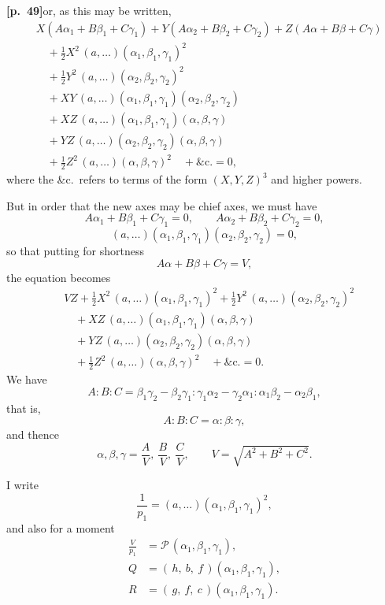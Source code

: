 \documentclass[11pt,a4paper]{article}
\begin{document}
\noindent\textbf{[p.~49]}\quad or, as this may be written,
\begin{align*}
& X(A\alpha_{1} + B\beta_{1} + C\gamma_{1}) + Y(A\alpha_{2} + B\beta_{2} + C\gamma_{2}) + Z(A\alpha + B\beta + C\gamma) \\
&\quad + \tfrac{1}{2}X^{2}\,(a, \ldots)(\alpha_{1}, \beta_{1}, \gamma_{1})^{2} \\
&\quad + \tfrac{1}{2}Y^{2}\,(a, \ldots)(\alpha_{2}, \beta_{2}, \gamma_{2})^{2} \\
&\quad + XY\,(a, \ldots)(\alpha_{1}, \beta_{1}, \gamma_{1})(\alpha_{2}, \beta_{2}, \gamma_{2}) \\
&\quad + XZ\,(a, \ldots)(\alpha_{1}, \beta_{1}, \gamma_{1})(\alpha, \beta, \gamma) \\
&\quad + YZ\,(a, \ldots)(\alpha_{2}, \beta_{2}, \gamma_{2})(\alpha, \beta, \gamma) \\
&\quad + \tfrac{1}{2}Z^{2}\,(a, \ldots)(\alpha, \beta, \gamma)^{2} \quad + \&\text{c.} = 0,
\end{align*}
where the \&c.\ refers to terms of the form $(X, Y, Z)^{3}$ and higher powers.

But in order that the new axes may be chief axes, we must have
\[
A\alpha_{1} + B\beta_{1} + C\gamma_{1} = 0,\qquad A\alpha_{2} + B\beta_{2} + C\gamma_{2} = 0,
\]
\[
(a, \ldots)(\alpha_{1}, \beta_{1}, \gamma_{1})(\alpha_{2}, \beta_{2}, \gamma_{2}) = 0,
\]
so that putting for shortness
\[
A\alpha + B\beta + C\gamma = V,
\]
the equation becomes
\begin{align*}
& VZ + \tfrac{1}{2}X^{2}\,(a, \ldots)(\alpha_{1}, \beta_{1}, \gamma_{1})^{2} + \tfrac{1}{2}Y^{2}\,(a, \ldots)(\alpha_{2}, \beta_{2}, \gamma_{2})^{2} \\
&\quad + XZ\,(a, \ldots)(\alpha_{1}, \beta_{1}, \gamma_{1})(\alpha, \beta, \gamma) \\
&\quad + YZ\,(a, \ldots)(\alpha_{2}, \beta_{2}, \gamma_{2})(\alpha, \beta, \gamma) \\
&\quad + \tfrac{1}{2}Z^{2}\,(a, \ldots)(\alpha, \beta, \gamma)^{2} \quad + \&\text{c.} = 0.
\end{align*}
We have
\[
A : B : C = \beta_{1}\gamma_{2} - \beta_{2}\gamma_{1} : \gamma_{1}\alpha_{2} - \gamma_{2}\alpha_{1} : \alpha_{1}\beta_{2} - \alpha_{2}\beta_{1},
\]
that is,
\[
A : B : C = \alpha : \beta : \gamma,
\]
and thence
\[
\alpha, \beta, \gamma = \frac{A}{V},\ \frac{B}{V},\ \frac{C}{V},\qquad V = \sqrt{A^{2} + B^{2} + C^{2}}.
\]

I write
\[
\frac{1}{p_{1}} = (a, \ldots)(\alpha_{1}, \beta_{1}, \gamma_{1})^{2},
\]
and also for a moment
\[
\begin{aligned}
\frac{V}{p_{1}} &= \mathcal{P}\,(\alpha_{1}, \beta_{1}, \gamma_{1}), \\
Q &= (\,h,\ b,\ f\,)(\alpha_{1}, \beta_{1}, \gamma_{1}), \\
R &= (\,g,\ f,\ c\,)(\alpha_{1}, \beta_{1}, \gamma_{1}).
\end{aligned}
\]
\end{document}
